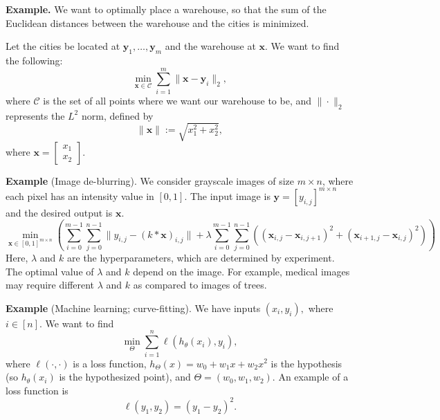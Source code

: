 \documentclass[twoside]{article}
\begin{document}
\textbf{Example.} We want to optimally place a warehouse, so that the sum of the
Euclidean distances between the warehouse and the cities is minimized.

Let the cities be located at $\mathbf{y}_1, \ldots, \mathbf{y}_m$ and the
warehouse at $\mathbf{x}$. We want to find the following: \[
    \min_{\mathbf{x} \in \mathscr{C}}
    \sum_{i = 1}^{m} \|\mathbf{x} - \mathbf{y}_i\|_2,
\] where $\mathscr{C}$ is the set of all points where we want our warehouse to
be, and $\| \cdot \|_2$ represents the $L^2$ norm, defined by \[
   \|\mathbf{x}\| := \sqrt{x_1^2 + x_2^2},
\] where $\mathbf{x} = \begin{bmatrix} x_1 \\ x_2 \end{bmatrix}$.


\textbf{Example} (Image de-blurring). We consider grayscale images of size $m
\times n$, where each pixel has an intensity value in $[0, 1].$ The input image
is $\mathbf{y} = [y_{i, j}]^{m \times n}$ and the desired output is
$\mathbf{x}.$
\[
    \min_{\mathbf{x} \in [0, 1]^{m \times n}}
    \left(
        \sum_{i = 0}^{m - 1} \sum_{j = 0}^{n - 1}
            \|y_{i, j} - (k * \mathbf{x})_{i, j}\|
        + \lambda \sum_{i = 0}^{m - 1} \sum_{j = 0}^{n - 1}
            ((\mathbf{x}_{i, j} - \mathbf{x}_{i, j + 1})^2
             + (\mathbf{x}_{i + 1, j} - \mathbf{x}_{i, j})^2)
    \right)
\] Here, $\lambda$ and $k$ are the hyperparameters, which are determined by
experiment. The optimal value of $\lambda$ and $k$ depend on the image. For
example, medical images may require different $\lambda$ and $k$ as compared to
images of trees.


\textbf{Example} (Machine learning; curve-fitting). We have inputs $(x_i, y_i),$
where $i \in [n].$ We want to find \[
    \min_\Theta \sum_{i = 1}^{n} \ell(h_\theta(x_i), y_i),
\] where $\ell(\cdot, \cdot)$ is a loss function, $h_\Theta(x) = w_0 + w_1 x +
w_2 x^2$ is the hypothesis (so $h_\theta(x_i)$ is the hypothesized point), and
$\Theta = (w_0, w_1, w_2)$. An example of a loss function is \[
    \ell(y_1, y_2) = (y_1 - y_2)^2.
\] 
\end{document}

